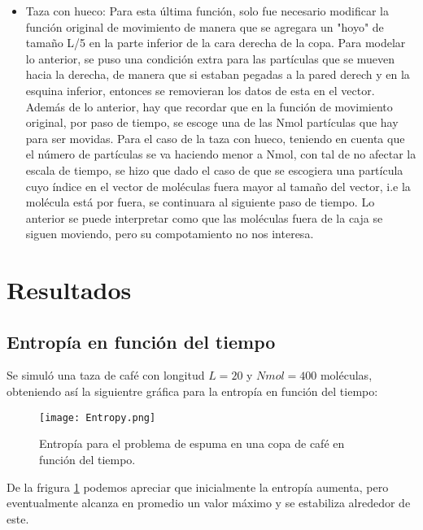 \documentclass{article}
\begin{document}
\begin{itemize}
    \item Taza con hueco: Para esta última función, solo fue necesario modificar la función original de movimiento de manera que se agregara un "hoyo" de tamaño L/5 en la parte inferior de la cara derecha de la copa. Para modelar lo anterior, se puso una condición extra para las partículas que se mueven hacia la derecha, de manera que si estaban pegadas a la pared derech y en la esquina inferior, entonces se removieran los datos de esta en el vector. Además de lo anterior, hay que recordar que en la función de movimiento original, por paso de tiempo, se escoge una de las Nmol partículas que hay para ser movidas. Para el caso de la taza con hueco, teniendo en cuenta que el número de partículas se va haciendo menor a Nmol, con tal de no afectar la escala de tiempo, se hizo que dado el caso de que se escogiera una partícula cuyo índice en el vector de moléculas fuera mayor al tamaño del vector, i.e la molécula está por fuera, se continuara al siguiente paso de tiempo. Lo anterior se puede interpretar como que las moléculas fuera de la caja se siguen moviendo, pero su compotamiento no nos interesa.
    
\end{itemize}



    

\section{Resultados}

\subsection{Entropía en función del tiempo}
Se simuló una taza de café con longitud $L=20$ y $Nmol=400$ moléculas, obteniendo así la siguientre gráfica para la entropía en función del tiempo:
\begin{figure}[H]
   \centering
   \texttt{[image: Entropy.png]}
   \caption{Entropía para el problema de espuma en una copa de café en función del tiempo.}
   \label{fig:entropy}
 \end{figure}
 
 De la frigura \ref{fig:entropy} podemos apreciar que inicialmente la entropía aumenta, pero eventualmente alcanza en promedio un valor máximo y se estabiliza alrededor de este.
\end{document}

